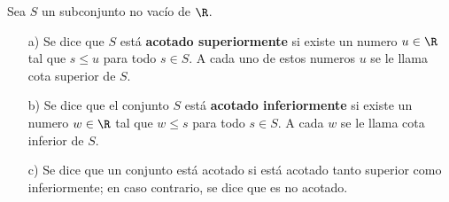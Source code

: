 \begin{definition}
	Sea \(S \) un subconjunto no vacío de \(\R \).

	\begin{enumerate}
		\item[a)] Se dice que \(S \) está \textbf{acotado superiormente} si existe un numero \(u \in \R \) tal que \(s \leq u \) para todo \(s \in S\). A cada uno de estos numeros \(u \) se le llama cota superior de \(S \).

			\item[b)]Se dice que el conjunto \(S \) está \textbf{acotado inferiormente} si existe un numero \(w \in \R \) tal que \(w \leq s \) para todo \(s \in S \). A cada \(w \) se le llama cota inferior de \(S \).

		\item[c)] Se dice que un conjunto está acotado si está acotado tanto superior como inferiormente; en caso contrario, se dice que es no acotado.
	\end{enumerate}
\end{definition}

